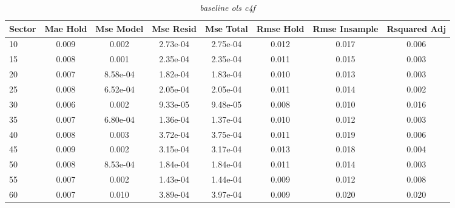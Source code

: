 \begin{table}[H]
\caption{\textit{baseline ols c4f}}\label{tab:baseline_ols_c4f}
\centering
\begin{tabular}{lccccccc}
\hline\hline
Sector & Mae Hold & Mse Model & Mse Resid & Mse Total & Rmse Hold & Rmse Insample & Rsquared Adj \\ 
\hline
10 & 0.009 & 0.002 & 2.73e-04 & 2.75e-04 & 0.012 & 0.017 & 0.006 \\ 
15 & 0.008 & 0.001 & 2.35e-04 & 2.35e-04 & 0.011 & 0.015 & 0.003 \\ 
20 & 0.007 & 8.58e-04 & 1.82e-04 & 1.83e-04 & 0.010 & 0.013 & 0.003 \\ 
25 & 0.008 & 6.52e-04 & 2.05e-04 & 2.05e-04 & 0.011 & 0.014 & 0.002 \\ 
30 & 0.006 & 0.002 & 9.33e-05 & 9.48e-05 & 0.008 & 0.010 & 0.016 \\ 
35 & 0.007 & 6.80e-04 & 1.36e-04 & 1.37e-04 & 0.010 & 0.012 & 0.003 \\ 
40 & 0.008 & 0.003 & 3.72e-04 & 3.75e-04 & 0.011 & 0.019 & 0.006 \\ 
45 & 0.009 & 0.002 & 3.15e-04 & 3.17e-04 & 0.013 & 0.018 & 0.004 \\ 
50 & 0.008 & 8.53e-04 & 1.84e-04 & 1.84e-04 & 0.011 & 0.014 & 0.003 \\ 
55 & 0.007 & 0.002 & 1.43e-04 & 1.44e-04 & 0.009 & 0.012 & 0.008 \\ 
60 & 0.007 & 0.010 & 3.89e-04 & 3.97e-04 & 0.009 & 0.020 & 0.020 \\ 
\hline
\end{tabular}
\end{table}


